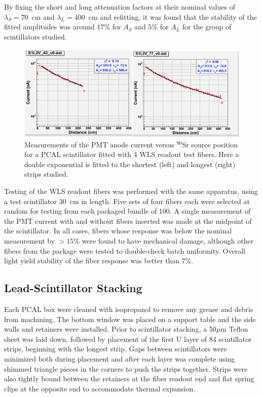 By fixing the short and long attenuation factors at their nominal values of $\lambda_S=70$~cm and
$\lambda_L=400$~cm and refitting, it was found that the stability of the fitted amplitudes was around $17\%$
for $A_S$ and $5\%$ for $A_L$ for the group of scintillators studied. 

\begin{figure}[hbt]
\centering
\includegraphics[width=0.95\columnwidth,keepaspectratio]{img/S5_0.png}
\caption{Measurements of the PMT anode current versus $^{90}$Sr source position for a PCAL scintillator fitted
  with 4 WLS readout test fibers. Here a double exponential is fitted to the shortest (left) and longest (right)
  strips studied.}
\label{fig:S5_0}
\end{figure}

Testing of the WLS readout fibers was performed with the same apparatus, using a test scintillator 30~cm in
length. Five sets of four fibers each were selected at random for testing from each packaged bundle of 100.
A single measurement of the PMT current with and without fibers inserted was made at the midpoint of the
scintillator. In all cases, fibers whose response was below the nominal measurement by $>15\%$ were found to
have mechanical damage, although other fibers from the package were tested to double-check batch uniformity.
Overall light yield stability of the fiber response was better than $7\%$.
 
\subsection{Lead-Scintillator Stacking}

Each PCAL box were cleaned with isopropanol to remove any grease and debris from machining. The bottom window
was placed on a support table and the side walls and retainers were installed. Prior to scintillator stacking, a
50$\mu$m Teflon sheet was laid down, followed by placement of the first U layer of 84 scintillator strips, beginning
with the longest strip. Gaps between scintillators were minimized both during placement and after each layer was
complete using shimmed triangle pieces in the corners to push the strips together. Strips were also tightly bound
between the retainers at the fiber readout end and flat spring clips at the opposite end to accommodate thermal
expansion.

